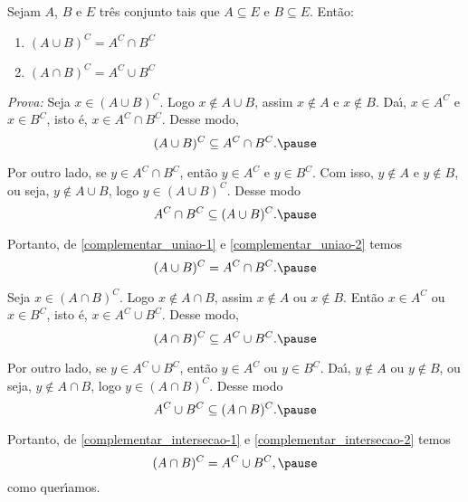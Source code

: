 \documentclass{beamer}
\begin{document}
    \begin{frame}
        \begin{proposicao}
            Sejam $A$, $B$ e $E$ tr{\^e}s conjunto \pause tais que $A\subseteq E$ \pause e $B\subseteq E$. \pause Ent{\~a}o:\pause
            \begin{enumerate}[label={\roman*})]
                \item $(A\cup B)^C = A^C\cap B^C$\pause
                \item $(A\cap B)^C = A^C\cup B^C$\pause
            \end{enumerate}
        \end{proposicao}
        \textit{Prova: }\pause
        Seja $x \in (A\cup B)^C$. \pause Logo $x\notin A\cup B$, \pause assim $x\notin A$ \pause e $x\notin B$. \pause Da{\'\i}, $x\in A^C$ \pause e $x\in B^C$, \pause isto {\'e}, $x\in A^C\cap B^C$. \pause Desse modo, \pause
        \begin{equation}\label{complementar_uniao-1}
            (A\cup B)^C \subseteq A^C\cap B^C.\pause
        \end{equation}

        Por outro lado, \pause se $y \in A^C \cap B^C$, \pause ent{\~a}o $y \in A^C$ \pause e $y \in B^C$. \pause Com isso, $y \notin A$ \pause e $y \notin B$, \pause ou seja, $y\notin A\cup B$, \pause logo $y\in (A\cup B)^C$. \pause Desse modo
        \begin{equation}\label{complementar_uniao-2}
            A^C\cap B^C\subseteq(A\cup B)^C.\pause
        \end{equation}
    \end{frame}

    \begin{frame}
        Portanto, \pause de \eqref{complementar_uniao-1} e \eqref{complementar_uniao-2} temos\pause
        \[
            (A\cup B)^C = A^C\cap B^C.\pause
        \]

        Seja $x \in (A \cap B)^C$. \pause Logo $x \notin A \cap B$, \pause assim $x \notin A$ \pause ou $x \notin B$. \pause Ent\~ao $x \in A^C$ \pause ou $x \in B^C$, \pause isto {\'e}, $ x\in A^C \cup B^C$. \pause Desse modo,
        \begin{equation}\label{complementar_intersecao-1}
            (A\cap B)^C \subseteq A^C\cup B^C.\pause
        \end{equation}

        Por outro lado, \pause se $y \in A^C \cup B^C$, \pause ent{\~a}o $y \in A^C$ \pause ou $y \in B^C$. \pause Da{\'\i}, $y \notin A$ \pause ou $y \notin B$, \pause ou seja, $y \notin A \cap B$, \pause logo $y \in (A \cap B)^C$. \pause Desse modo
        \begin{equation}\label{complementar_intersecao-2}
            A^C \cup B^C \subseteq (A \cap B)^C.\pause
        \end{equation}

        Portanto, \pause de \eqref{complementar_intersecao-1} e \eqref{complementar_intersecao-2} temos\pause
        \[
            (A\cap B)^C = A^C\cup B^C,\pause
        \]
        como quer{\'\i}amos.\qedsymbol
    \end{frame}
\end{document}
